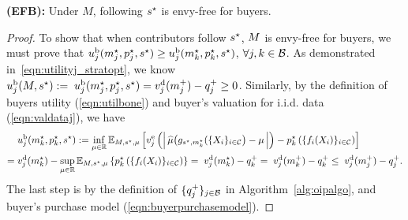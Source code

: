 \noindent
    \textbf{(EFB):}
    Under $M$, following $s^\star$ is envy-free for buyers.
\begin{proof}
    To show that when contributors follow $s^\star$, $M$ is envy-free for buyers, we must prove that $u^{\rm b}_{j}(m^\star_j, p^\star_j, s^\star) 
    \geq u^{\rm b}_{j}(m^\star_k, p^\star_k, s^\star)$, $\forall j,k\in\mathcal{B}$. As demonstrated in~\eqref{eqn:utilityj_stratopt}, we know $u^{\rm b}_{j}(M, s^\star)  := \; 
        u^{\rm b}_{j}(m^\star_j, p^\star_j, s^\star) = v^{\rm d}_{j}(m_{j}^{+})- q_j^{+} \geq 0$. 
 Similarly, by the definition of buyers utility (\ref{eqn:utilbone}) and buyer's valuation for i.i.d. data (\ref{eqn:valdataj}), we have
       \begin{align*}           
       & u^{\rm b}_{j}(m^\star_k, p^\star_k, s^\star)  := 
        \inf_{\mu\in\mathbb{R}} \mathbb{E}_{M, s^\star, \mu}\left[ v^{\rm e}_{j}\left( 
       \left|\,\widehat{\mu}\big(g_{s^\star, m^\star_k}( \{X_{i}\}_{i\in\mathcal{C}} \big) - \mu\,\right| \right) -p^\star_k\left( \{ f_i(X_{i})\}_{i\in\mathcal{C}}\right)\right] \\  =  \; & v^{\rm d}_{j}(m^\star_k)-  \sup_{\mu\in\mathbb{R}}\mathbb{E}_{M, s^\star, \mu}\left\{p^\star_k\left( \{ f_i(X_{i})\}_{i\in\mathcal{C}}\right)  \right\} = \; v^{\rm d}_{j}(m^\star_k)- q_k^{+} = \; v^{\rm d}_{j}(m_{k}^{+})- q_k^{+} 
 \leq \; v^{\rm d}_{j}(m_{j}^{+})- q_j^{+} .
    \end{align*}
The last step is by the definition of $\{q^+_j\}_{j \in \mathcal{B}}$ in Algorithm~\ref{alg:oipalgo}, and buyer's purchase model (\ref{eqn:buyerpurchasemodel}).
\end{proof} 

